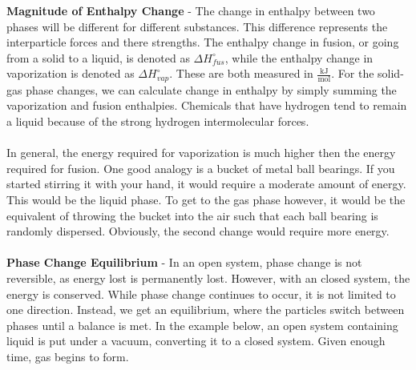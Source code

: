 \documentclass{article}
\begin{document}
\vspace{15pt}
\noindent\textbf{Magnitude of Enthalpy Change} - The change in enthalpy between two phases will be different for different substances. This difference represents the interparticle forces and there strengths. The enthalpy change in fusion, or going from a solid to a liquid, is denoted as $\Delta H^{\circ}_{fus}$, while the enthalpy change in vaporization is denoted as $\Delta H^{\circ}_{vap}$. These are both measured in $\frac{\text{kJ}}{\text{mol}}$. For the solid-gas phase changes, we can calculate change in enthalpy by simply summing the vaporization and fusion enthalpies. Chemicals that have hydrogen tend to remain a liquid because of the strong hydrogen intermolecular forces.\\
\\
In general, the energy required for vaporization is much higher then the energy required for fusion. One good analogy is a bucket of metal ball bearings. If you started stirring it with your hand, it would require a moderate amount of energy. This would be the liquid phase. To get to the gas phase however, it would be the equivalent of throwing the bucket into the air such that each ball bearing is randomly dispersed. Obviously, the second change would require more energy. \\
\\
\textbf{Phase Change Equilibrium} - In an open system, phase change is not reversible, as energy lost is permanently lost. However, with an closed system, the energy is conserved. While phase change continues to occur, it is not limited to one direction. Instead, we get an equilibrium, where the particles switch between phases until a balance is met. In the example below, an open system containing liquid is put under a vacuum, converting it to a closed system. Given enough time, gas begins to form.
\vspace{15pt}
\end{document}

